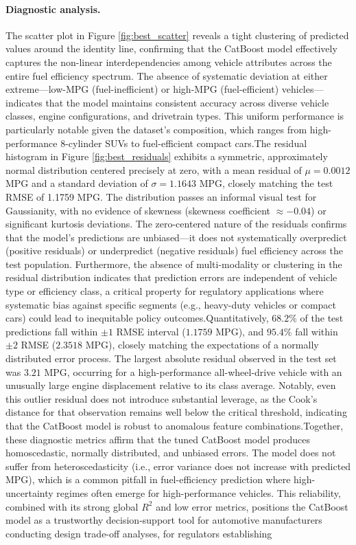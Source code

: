 \paragraph{Diagnostic analysis.}
The scatter plot in Figure \ref{fig:best_scatter}\cite{atique2026explainable} reveals a tight clustering of predicted values around the identity line, confirming that the CatBoost model effectively captures the non-linear interdependencies among vehicle attributes across the entire fuel efficiency spectrum. The absence of systematic deviation at either extreme—low-MPG (fuel-inefficient) or high-MPG (fuel-efficient) vehicles—indicates that the model maintains consistent accuracy across diverse vehicle classes, engine configurations, and drivetrain types. This uniform performance is particularly notable given the dataset's composition, which ranges from high-performance 8-cylinder SUVs to fuel-efficient compact cars.The residual histogram in Figure \ref{fig:best_residuals}\cite{atique2026explainable} exhibits a symmetric, approximately normal distribution centered precisely at zero, with a mean residual of \(\mu = 0.0012\) MPG and a standard deviation of \(\sigma = 1.1643\) MPG, closely matching the test RMSE of 1.1759 MPG. The distribution passes an informal visual test for Gaussianity, with no evidence of skewness (skewness coefficient \(\approx -0.04\)) or significant kurtosis deviations. The zero-centered nature of the residuals confirms that the model's predictions are unbiased—it does not systematically overpredict (positive residuals) or underpredict (negative residuals) fuel efficiency across the test population. Furthermore, the absence of multi-modality or clustering in the residual distribution indicates that prediction errors are independent of vehicle type or efficiency class, a critical property for regulatory applications where systematic bias against specific segments (e.g., heavy-duty vehicles or compact cars) could lead to inequitable policy outcomes.Quantitatively, \(68.2\%\) of the test predictions fall within \(\pm 1\) RMSE interval (\(1.1759\) MPG), and \(95.4\%\) fall within \(\pm 2\) RMSE (\(2.3518\) MPG), closely matching the expectations of a normally distributed error process. The largest absolute residual observed in the test set was \(3.21\) MPG, occurring for a high-performance all-wheel-drive vehicle with an unusually large engine displacement relative to its class average. Notably, even this outlier residual does not introduce substantial leverage, as the Cook's distance for that observation remains well below the critical threshold, indicating that the CatBoost model is robust to anomalous feature combinations.Together, these diagnostic metrics affirm that the tuned CatBoost model produces homoscedastic, normally distributed, and unbiased errors. The model does not suffer from heteroscedasticity (i.e., error variance does not increase with predicted MPG), which is a common pitfall in fuel-efficiency prediction where high-uncertainty regimes often emerge for high-performance vehicles. This reliability, combined with its strong global \(R^2\) and low error metrics, positions the CatBoost model as a trustworthy decision-support tool for automotive manufacturers conducting design trade-off analyses, for regulators establishing 